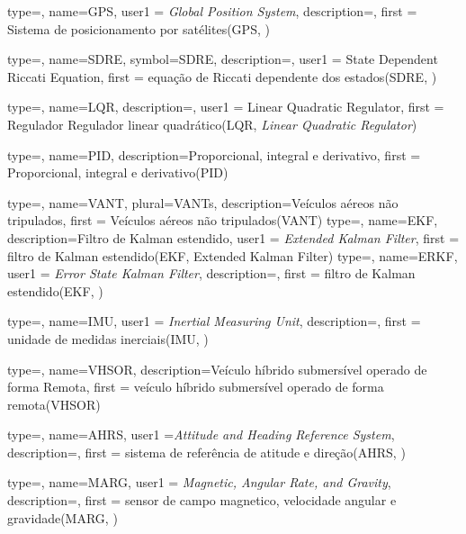 {type=\acronymtype,
  name=GPS,
user1 = {\emph{Global Position System}},
  description={},
  first = {Sistema de posicionamento por satélites(GPS, )}
}

{type=\acronymtype,
  name=SDRE,
  symbol=SDRE,
  description={\emph{}},
  user1 = {State Dependent Riccati Equation},
  first = {equação de Riccati dependente dos estados(SDRE, \emph{})}
}

{type=\acronymtype,
  name=LQR,
  description={\emph{}},
  user1 = {Linear Quadratic Regulator},
  first = {Regulador Regulador linear quadrático(LQR, \emph{Linear Quadratic Regulator})}
}


{type=\acronymtype,
  name=PID,
  description={Proporcional, integral e derivativo},
  first = {Proporcional, integral e derivativo(PID)}
}

{type=\acronymtype,
  name=VANT,
  plural={VANTs},
  description={Veículos aéreos não tripulados},
  first = {Veículos aéreos não tripulados(VANT)}
}
{type=\acronymtype,
  name=EKF,
  description={Filtro de Kalman estendido},
  user1 = \emph{Extended Kalman Filter},
  first = {filtro de Kalman estendido(EKF, Extended Kalman Filter)}
}
{type=\acronymtype,
  name=ERKF,
user1 = \emph{Error State Kalman Filter},
  description={},
  first = {filtro de Kalman estendido(EKF, )}
}

{type=\acronymtype,
  name=IMU,
user1 = \emph{Inertial Measuring Unit},
  description={},
  first = {unidade de medidas inerciais(IMU, )}
}

{type=\acronymtype,
  name=VHSOR,
  description={Veículo híbrido submersível operado de forma Remota},
  first = {veículo híbrido submersível operado de forma remota(VHSOR)}
}

{type=\acronymtype,
  name=AHRS,
user1 ={\emph{Attitude and Heading Reference System}},
  description={},
  first = {sistema de referência de atitude e direção(AHRS, )}
}

{type=\acronymtype,
  name=MARG,
  user1 = {\emph{Magnetic, Angular Rate, and Gravity}},
  description={},
  first = {sensor de campo magnetico, velocidade angular e gravidade(MARG, )}
}

